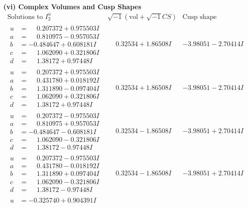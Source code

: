 \documentclass[1p]{elsarticle_modified}
\theoremstyle{definition}
\newcommand{\I}{\sqrt{-1}}
\begin{document}
\newpage\flushleft \textbf{(vi) Complex Volumes and Cusp Shapes}
$$\begin{array}{c|c|c}  
\text{Solutions to }I^u_{2}& \I (\text{vol} + \sqrt{-1}CS) & \text{Cusp shape}\\
 \hline 
\begin{aligned}
u &= \phantom{-}0.207372 + 0.975503 I \\
a &= \phantom{-}0.810975 - 0.957053 I \\
b &= -0.484647 + 0.608181 I \\
c &= \phantom{-}1.062090 + 0.321806 I \\
d &= \phantom{-}1.38172 + 0.97448 I\end{aligned}
 & \phantom{-}0.32534 + 1.86508 I & -3.98051 - 2.70414 I \\ \hline\begin{aligned}
u &= \phantom{-}0.207372 + 0.975503 I \\
a &= \phantom{-}0.431780 + 0.018192 I \\
b &= \phantom{-}1.311890 - 0.097404 I \\
c &= \phantom{-}1.062090 + 0.321806 I \\
d &= \phantom{-}1.38172 + 0.97448 I\end{aligned}
 & \phantom{-}0.32534 + 1.86508 I & -3.98051 - 2.70414 I \\ \hline\begin{aligned}
u &= \phantom{-}0.207372 - 0.975503 I \\
a &= \phantom{-}0.810975 + 0.957053 I \\
b &= -0.484647 - 0.608181 I \\
c &= \phantom{-}1.062090 - 0.321806 I \\
d &= \phantom{-}1.38172 - 0.97448 I\end{aligned}
 & \phantom{-}0.32534 - 1.86508 I & -3.98051 + 2.70414 I \\ \hline\begin{aligned}
u &= \phantom{-}0.207372 - 0.975503 I \\
a &= \phantom{-}0.431780 - 0.018192 I \\
b &= \phantom{-}1.311890 + 0.097404 I \\
c &= \phantom{-}1.062090 - 0.321806 I \\
d &= \phantom{-}1.38172 - 0.97448 I\end{aligned}
 & \phantom{-}0.32534 - 1.86508 I & -3.98051 + 2.70414 I \\ \hline\begin{aligned}
u &= -0.325740 + 0.904391 I \\

\end{aligned}
\end{array}$$
\end{document}
